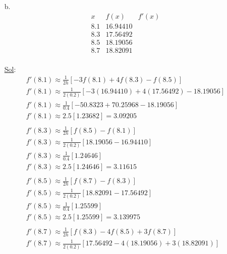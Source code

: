 \begin{enumerate}
\begin{enumerate}
      \item[b.] \[
          \begin{array}{c|c|c}
            x & f(x) & f'(x) \\
            \hline
            8.1 & 16.94410 & \\
            8.3 & 17.56492 & \\
            8.5 & 18.19056 & \\
            8.7 & 18.82091 & \\
          \end{array}
        \]

        \underline{Sol}:\\

        \[
          \begin{array}{l}
            f'(8.1) \approx \frac{1}{2h}[-3f(8.1) + 4f(8.3) - f(8.5)] \\
            f'(8.1) \approx \frac{1}{2(0.2)}[-3(16.94410) + 4(17.56492) - 18.19056] \\
            f'(8.1) \approx \frac{1}{0.4}[-50.8323 + 70.25968 - 18.19056] \\
            f'(8.1) \approx 2.5[1.23682] = 3.09205 \\ \\
            f'(8.3) \approx \frac{1}{2h}[f(8.5) - f(8.1)] \\
            f'(8.3) \approx \frac{1}{2(0.2)}[18.19056 - 16.94410] \\
            f'(8.3) \approx \frac{1}{0.4}[1.24646] \\
            f'(8.3) \approx 2.5[1.24646] = 3.11615 \\ \\
            f'(8.5) \approx \frac{1}{2h}[f(8.7) - f(8.3)] \\
            f'(8.5) \approx \frac{1}{2(0.2)}[18.82091 - 17.56492] \\
            f'(8.5) \approx \frac{1}{0.4}[1.25599] \\
            f'(8.5) \approx 2.5[1.25599] = 3.139975 \\ \\
            f'(8.7) \approx \frac{1}{2h}[f(8.3) - 4f(8.5) + 3f(8.7)] \\ %
            f'(8.7) \approx \frac{1}{2(0.2)}[17.56492 - 4(18.19056) + 3(18.82091)] \\

\end{array}\]
\end{enumerate}
\end{enumerate}
